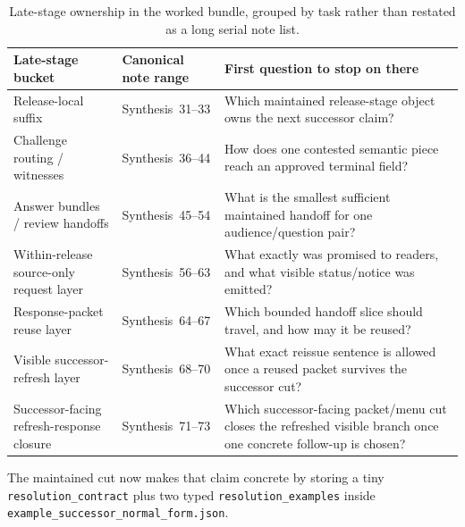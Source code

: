 \documentclass[11pt]{article}
\begin{document}
\begin{table}[t]
\centering
\small
\begin{tabularx}{\linewidth}{@{}l l X@{}}
\toprule
Late-stage bucket & Canonical note range & First question to stop on there \\
\midrule
Release-local suffix & Synthesis~31--33 & Which maintained release-stage object owns the next successor claim? \\
Challenge routing / witnesses & Synthesis~36--44 & How does one contested semantic piece reach an approved terminal field? \\
Answer bundles / review handoffs & Synthesis~45--54 & What is the smallest sufficient maintained handoff for one audience/question pair? \\
Within-release source-only request layer & Synthesis~56--63 & What exactly was promised to readers, and what visible status/notice was emitted? \\
Response-packet reuse layer & Synthesis~64--67 & Which bounded handoff slice should travel, and how may it be reused? \\
Visible successor-refresh layer & Synthesis~68--70 & What exact reissue sentence is allowed once a reused packet survives the successor cut? \\
Successor-facing refresh-response closure & Synthesis~71--73 & Which successor-facing packet/menu cut closes the refreshed visible branch once one concrete follow-up is chosen? \\
\bottomrule
\end{tabularx}
\caption{Late-stage ownership in the worked bundle, grouped by task rather than restated as a long serial note list.}
\label{tab:workedexample-latestage-buckets}
\end{table}
The maintained cut now makes that claim concrete by storing a tiny \texttt{resolution\_contract} plus two typed \texttt{resolution\_examples} inside \texttt{example\_successor\_normal\_form.json}.
\end{document}
